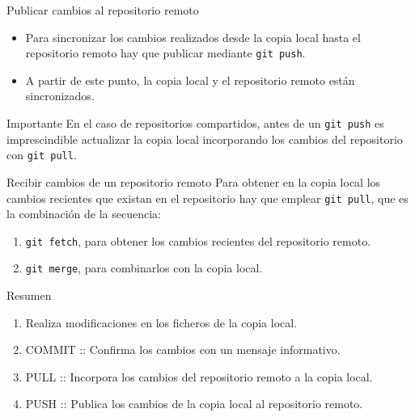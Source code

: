\documentclass[xcolor={usenames,svgnames,dvipsnames}]{beamer}
\begin{document}
\begin{frame}[label={sec:org42b2c95},fragile]{Publicar cambios al repositorio remoto}
 \begin{itemize}
\item Para sincronizar  los cambios realizados \alert{desde la copia local hasta el repositorio remoto} hay que publicar mediante \texttt{git push}.
\end{itemize}

\begin{center}
\end{center}

\begin{itemize}
\item A partir de este punto, la copia local y el repositorio remoto están sincronizados.
\end{itemize}

\begin{block}{Importante}
En el caso de repositorios compartidos, antes de un \texttt{git push} es imprescindible actualizar la copia local incorporando los cambios del repositorio con \texttt{git pull}.
\end{block}
\end{frame}
\begin{frame}[label={sec:orgab520d6},fragile]{Recibir cambios de un repositorio remoto}
 Para obtener en la copia local los cambios recientes que existan en el repositorio hay que emplear \texttt{git pull}, que es la combinación de la secuencia:
\begin{enumerate}
\item \texttt{git fetch}, para obtener los cambios recientes del repositorio remoto.
\item \texttt{git merge}, para combinarlos con la copia local.
\end{enumerate}

\begin{center}
\end{center}
\end{frame}

\begin{frame}[label={sec:org8d38e74}]{Resumen}
\begin{enumerate}
\item Realiza modificaciones en los ficheros de la copia local.
\item \alert{COMMIT} :: Confirma los cambios con un mensaje informativo.
\item \alert{PULL} :: Incorpora los cambios del repositorio remoto a la copia local.
\item \alert{PUSH} :: Publica los cambios de la copia local al repositorio remoto.
\end{enumerate}
\end{frame}
\end{document}
